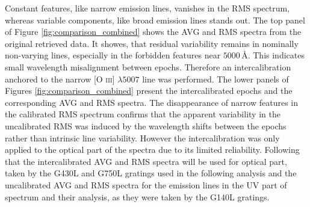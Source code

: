 Constant features, like narrow emission lines, vanishes in the RMS spectrum, whereas variable components, like broad emission lines stands out. The top panel of Figure \ref{fig:comparison_combined} shows the AVG and RMS spectra from the original retrieved data. It showes, that residual variability remains in nominally non-varying lines, especially in the forbidden features near $5000\,\text{\AA}$. This indicates small wavelength misalignment between epochs. Therefore an intercalibration anchored to the narrow [O \textsc{iii}] $\lambda5007$ line was performed. The lower panels of Figures \ref{fig:comparison_combined} present the intercalibrated epochs and the corresponding AVG and RMS spectra. The disappearance of narrow features in the calibrated RMS spectrum confirms that the apparent variability in the uncalibrated RMS was induced by the wavelength shifts between the epochs rather than intrinsic line variability. However the intercalibration was only applied to the optical part of the spectra  due to its limited reliability. Following that the intercalibrated AVG and RMS spectra will be used for optical part, taken by the G430L and G750L gratings used in the following analysis and the uncalibrated AVG and RMS spectra for the emission lines in the UV part of spectrum and their analysis, as they were taken by the G140L gratings. 


